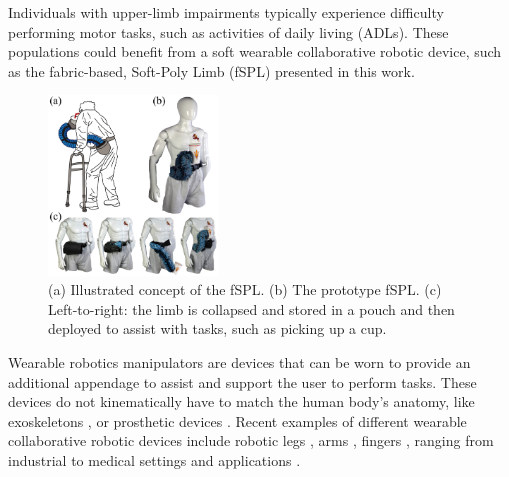 \documentclass[letterpaper, 10 pt, conference]{ieeeconf}  %
\begin{document}
Individuals with upper-limb impairments typically experience difficulty performing motor tasks, such as activities of daily living (ADLs). These populations could benefit from a soft wearable collaborative robotic device, such as the fabric-based, Soft-Poly Limb (fSPL) presented in this work.

\begin{figure}[t!]
\centering
\includegraphics[width=0.40\textwidth]{Figures/fig1_new_v3}
\setlength{\belowcaptionskip}{-26pt}
\caption{ (a) Illustrated concept of the fSPL. (b) The prototype fSPL. (c) Left-to-right: the limb is collapsed and stored in a pouch and then deployed to assist with tasks, such as picking up a cup.}
\label{fig:fig1}
\end{figure}


Wearable robotics manipulators are devices that can be worn to provide an additional appendage to assist and support the user to perform tasks. These devices do not kinematically have to match the human body's anatomy, like exoskeletons \cite{gopura2011}, or prosthetic devices \cite{bogue2009}. Recent examples of different wearable collaborative robotic devices include robotic legs \cite{kurek2017,parietti2015}, arms \cite{parietti2014,saraiji2018,vatsal2017}, fingers \cite{hussain2017b,wu2015,tiziani2017}, ranging from industrial \cite{parietti2014} to medical settings and applications \cite{tiziani2017}. 

\end{document}
